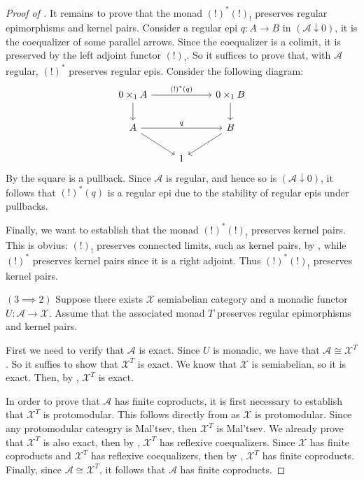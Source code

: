 \begin{subbox}{}
\begin{proof}[\textit{Proof of }]
    It remains to prove that the monad $(!)^*(!)_!$ preserves regular epimorphisms and kernel pairs. Consider a regular epi $q:A \to B$ in $(\mathcal{A} \downarrow 0)$, it is the coequalizer of some parallel arrows. Since the coequalizer is a colimit, it is preserved by the left adjoint functor $(!)_!$. So it suffices to prove that, with $\mathcal{A}$ regular, $(!)^*$ preserves regular epis. Consider the following diagram:
    \[%
    \begin{tikzcd}
    0\times_1A \arrow[d] \arrow[rr, "(!)^*(q)"] &   & 0\times_1B \arrow[d] \\
    A \arrow[rr, "q"] \arrow[rd]                &   & B \arrow[ld]         \\
                                                & 1 &                     
    \end{tikzcd}
    \]
    By  the square is a pullback. Since $\mathcal{A}$ is regular, and hence so is $(\mathcal{A} \downarrow 0)$, it follows that $(!)^*(q)$ is a regular epi due to the stability of regular epis under pullbacks.

    Finally, we want to establish that the monad $(!)^*(!)_!$ preserves kernel pairs. This is obvius: $(!)_!$ preserves connected limits, such as kernel pairs, by , while $(!)^*$ preserves kernel pairs since it is a right adjoint. Thus $(!)^*(!)_!$ preserves kernel pairs.

    $(3 \implies 2)$ Suppose there exists $\mathcal{X}$ semiabelian category and a monadic functor $U: \mathcal{A} \to \mathcal{X}$. Assume that the associated monad $T$ preserves regular epimorphisms and kernel pairs.
    
    First we need to verify that $\mathcal{A}$ is exact. Since $U$ is monadic, we have that $\mathcal{A} \cong \mathcal{X}^T$. So it suffies to show that $\mathcal{X}^T$ is exact. We know that $\mathcal{X}$ is semiabelian, so it is exact. Then, by , $\mathcal{X}^T$ is exact.

    In order to prove that $\mathcal{A}$ has finite coproducts, it is first necessary to establish that $\mathcal{X}^T$ is protomodular. This follows directly from  as $\mathcal{X}$ is protomodular. Since any protomodular cateogry is Mal'tsev, then $\mathcal{X}^T$ is Mal'tsev. We already prove that $\mathcal{X}^T$ is also exact, then by , $\mathcal{X}^T$ has reflexive coequalizers. Since $\mathcal{X}$ has finite coproducts and $\mathcal{X}^T$ has reflexive coequalizers, then by , $\mathcal{X}^T$ has finite coproducts. Finally, since $\mathcal{A} \cong \mathcal{X}^T$, it follows that $\mathcal{A}$  has finite coproducts.


\end{proof}
\end{subbox}

